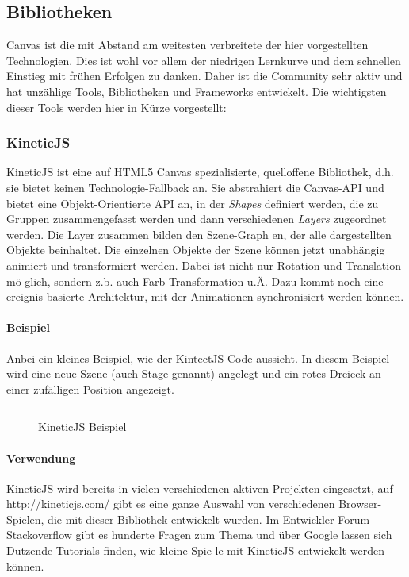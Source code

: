 \documentclass[a4paper, 12pt]{article}
\begin{document}
\subsection{Bibliotheken}
Canvas ist die mit Abstand am weitesten verbreitete der hier vorgestellten Technologien. Dies ist wohl vor allem der niedrigen Lernkurve und dem schnellen Einstieg mit frühen Erfolgen zu danken. Daher ist die Community sehr aktiv und hat unzählige Tools, Bibliotheken und Frameworks entwickelt. Die wichtigsten dieser Tools werden hier in Kürze vorgestellt:
\subsubsection{KineticJS}
KineticJS ist eine auf HTML5 Canvas spezialisierte, quelloffene Bibliothek, d.h. sie bietet keinen Technologie-Fallback an. Sie abstrahiert die Canvas-API und bietet eine Objekt-Orientierte API an, in der \emph{Shapes} definiert werden, die zu Gruppen zusammengefasst werden und dann verschiedenen \emph{Layers} zugeordnet werden. Die Layer zusammen bilden den Szene-Graph
en, der alle dargestellten Objekte beinhaltet. Die einzelnen Objekte der Szene können jetzt unabhängig animiert und transformiert werden. Dabei ist nicht nur Rotation und Translation mö
glich, sondern z.b. auch Farb-Transformation u.Ä. Dazu kommt noch eine ereignis-basierte Architektur, mit der Animationen synchronisiert werden können.
\paragraph{Beispiel}
Anbei ein kleines Beispiel, wie der KintectJS-Code aussieht. In diesem Beispiel wird eine neue Szene (auch Stage genannt) angelegt und ein rotes Dreieck an einer zufälligen Position angezeigt.
\begin{figure}[h!]
	\inputminted{javascript}{assets/kineticjs_example.js}
	\caption{KineticJS Beispiel}
	\label{kineticjs_example}
\end{figure}
\paragraph{Verwendung} KineticJS wird bereits in vielen verschiedenen aktiven Projekten eingesetzt, auf http://kineticjs.com/ gibt es eine ganze Auswahl von verschiedenen Browser-Spielen, die mit dieser Bibliothek entwickelt wurden. Im Entwickler-Forum Stackoverflow gibt es hunderte Fragen zum Thema und über Google lassen sich Dutzende Tutorials finden, wie kleine Spie
le mit KineticJS entwickelt werden können.
\end{document}
